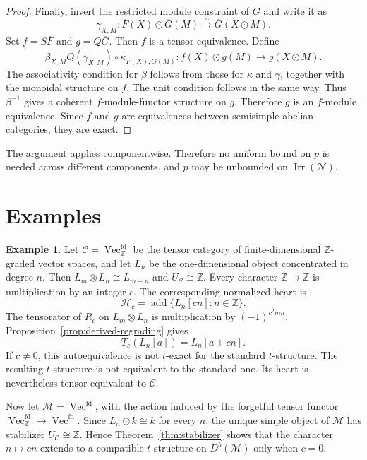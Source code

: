 \documentclass[11pt]{amsart}
\newcommand{\C}{\mathcal C}
\newcommand{\M}{\mathcal M}
\newcommand{\N}{\mathcal N}
\newcommand{\Hh}{\mathcal H}
\newcommand{\Irr}{\operatorname{Irr}}
\newcommand{\add}{\operatorname{add}}
\newcommand{\Vect}{\operatorname{Vec}}
\theoremstyle{definition}
\newtheorem{example}[theorem]{Example}
\theoremstyle{remark}
\theoremstyle{plain}
\begin{document}
\begin{proof}
Finally, invert the restricted module constraint of $\overline G$ and write it as
\begin{equation*}
\gamma_{X,M}:
\overline F(X)\odot\overline G(M)
\xrightarrow{\sim}
\overline G(X\odot M).
\end{equation*}
Set $f=S\overline F$ and $g=Q\overline G$. Then $f$ is a tensor equivalence. Define
\begin{equation*}
\beta_{X,M}
Q(\gamma_{X,M})\circ
\kappa_{\overline F(X),\overline G(M)}
:
f(X)\odot g(M)\rightarrow g(X\odot M).
\end{equation*}
The associativity condition for $\beta$ follows from those for $\kappa$ and $\gamma$, together with the monoidal structure on $f$. The unit condition follows in the same way. Thus $\beta^{-1}$ gives a coherent $f$-module-functor structure on $g$. Therefore $g$ is an $f$-module equivalence. Since $f$ and $g$ are equivalences between semisimple abelian categories, they are exact.
\end{proof}


The argument applies componentwise. Therefore no uniform bound on $p$ is needed across different components, and $p$ may be unbounded on $\Irr(\N)$.



\section{Examples}\label{sec:examples}


\begin{example}\label{ex:graded-vector-spaces}
Let $\C=\Vect_{\mathbb Z}^{\mathrm{fd}}$ be the tensor category of finite-dimensional $\mathbb Z$-graded vector spaces, and let $L_n$ be the one-dimensional object concentrated in degree $n$. Then $L_m\otimes L_n\cong L_{m+n}$ and $U_{\C}\cong\mathbb Z$. Every character $\mathbb Z\to\mathbb Z$ is multiplication by an integer $c$. The corresponding normalized heart is
\[
\Hh_c=\add\{L_n[cn]:n\in\mathbb Z\}.
\]
The tensorator of $R_c$ on $L_m\otimes L_n$ is multiplication by $(-1)^{c^2mn}$. Proposition~\ref{prop:derived-regrading} gives
\[
T_c(L_n[a])=L_n[a+cn].
\]
If $c\ne0$, this autoequivalence is not $t$-exact for the standard $t$-structure. The resulting $t$-structure is not equivalent to the standard one. Its heart is nevertheless tensor equivalent to $\C$.

Now let $\M=\Vect^{\mathrm{fd}}$, with the action induced by the forgetful tensor functor $\Vect_{\mathbb Z}^{\mathrm{fd}}\to\Vect^{\mathrm{fd}}$. Since $L_n\odot k\cong k$ for every $n$, the unique simple object of $\M$ has stabilizer $U_{\C}\cong\mathbb Z$. Hence Theorem~\ref{thm:stabilizer} shows that the character $n\mapsto cn$ extends to a compatible $t$-structure on $D^b(\M)$ only when $c=0$.
\end{example}
\end{document}
